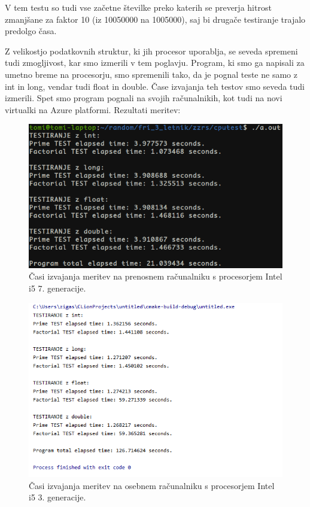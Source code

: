 V tem testu so tudi vse začetne številke preko katerih se preverja hitrost zmanjšane za faktor 10 (iz 10050000 na 1005000), saj bi drugače testiranje trajalo predolgo časa.

Z velikostjo podatkovnih struktur, ki jih procesor uporablja, se seveda spremeni tudi zmogljivost, kar smo izmerili v tem poglavju. Program, ki smo ga napisali za umetno breme na procesorju, smo spremenili tako, da je pognal teste ne samo z int in long, vendar tudi float in double. Čase izvajanja teh testov smo seveda tudi izmerili. Spet smo program pognali na svojih računalnikih, kot tudi na novi virtualki na Azure platformi. Rezultati meritev:

\begin{figure}[H]
	\centering
	\includegraphics[scale=0.55]{Img/3_T_cputest2.png}
	\caption{Časi izvajanja meritev na prenosnem računalniku s procesorjem Intel i5 7. generacije.}
	\label{3_T_cputest1}
\end{figure}

\begin{figure}[H]
	\centering
	\includegraphics[scale=0.63]{Img/3_Z_cputest2.png}
	\caption{Časi izvajanja meritev na osebnem računalniku s procesorjem Intel i5 3. generacije.}
	\label{3_Z_cputest2}
\end{figure}

